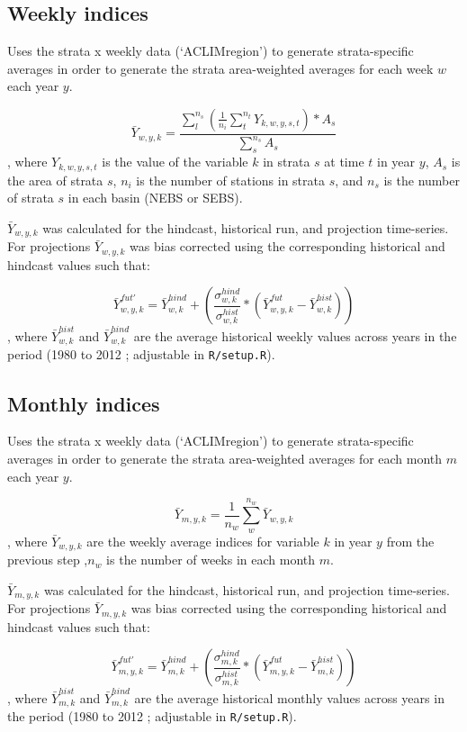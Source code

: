 \documentclass[
]{article}
\begin{document}
\hypertarget{weekly-indices}{%
\subsection{Weekly indices}\label{weekly-indices}}

Uses the strata x weekly data (`ACLIMregion') to generate
strata-specific averages in order to generate the strata area-weighted
averages for each week \(w\) each year \(y\).

\[\bar{Y}_{w,y,k}= \frac{\sum^{n_s}_{l}(\frac{1}{n_i}\sum^{n_t}_{t}Y_{k,w,y,s,t})*A_s} {\sum^{n_s}_{s}{A_s}}\],
where \(Y_{k,w,y,s,t}\) is the value of the variable \(k\) in strata
\(s\) at time \(t\) in year \(y\), \(A_s\) is the area of strata \(s\),
\(n_i\) is the number of stations in strata \(s\), and \(n_s\) is the
number of strata \(s\) in each basin (NEBS or SEBS).

\(\bar{Y}_{w,y,k}\) was calculated for the hindcast, historical run, and
projection time-series. For projections \(\bar{Y}_{w,y,k}\) was bias
corrected using the corresponding historical and hindcast values such
that:

\[\bar{Y}^{fut'}_{w,y,k} =\bar{Y}^{hind}_{w,k} +\left( \frac{\sigma^{hind}_{w,k}}{\sigma^{hist}_{w,k}}*(\bar{Y}^{fut}_{w,y,k}-\bar{Y}^{hist}_{w,k})  \right )\],
where \(\bar{Y}^{hist}_{w,k}\) and \(\bar{Y}^{hind}_{w,k}\) are the
average historical weekly values across years in the period (1980 to
2012 ; adjustable in \texttt{R/setup.R}).

\hypertarget{monthly-indices}{%
\subsection{Monthly indices}\label{monthly-indices}}

Uses the strata x weekly data (`ACLIMregion') to generate
strata-specific averages in order to generate the strata area-weighted
averages for each month \(m\) each year \(y\).

\[\bar{Y}_{m,y,k}= \frac{1}{n_w}\sum^{n_w}_{w}\bar{Y}_{w,y,k}\], where
\(\bar{Y}_{w,y,k}\) are the weekly average indices for variable \(k\) in
year \(y\) from the previous step ,\(n_w\) is the number of weeks in
each month \(m\).

\(\bar{Y}_{m,y,k}\) was calculated for the hindcast, historical run, and
projection time-series. For projections \(\bar{Y}_{m,y,k}\) was bias
corrected using the corresponding historical and hindcast values such
that:

\[\bar{Y}^{fut'}_{m,y,k} =\bar{Y}^{hind}_{m,k} +\left( \frac{\sigma^{hind}_{m,k}}{\sigma^{hist}_{m,k}}*(\bar{Y}^{fut}_{m,y,k}-\bar{Y}^{hist}_{m,k})  \right )\],
where \(\bar{Y}^{hist}_{m,k}\) and \(\bar{Y}^{hind}_{m,k}\) are the
average historical monthly values across years in the period (1980 to
2012 ; adjustable in \texttt{R/setup.R}).
\end{document}
